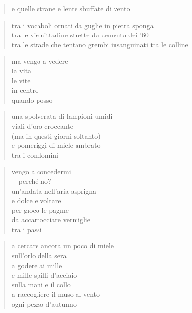 \begin{verse}
    e quelle strane e lente sbuffate di vento
\end{verse}

\begin{verse}
    tra i vocaboli ornati da guglie in pietra sponga\\
    tra le vie cittadine strette da cemento dei '60\\
    tra le strade che tentano grembi insanguinati tra le colline
\end{verse}

\begin{verse}
    ma vengo a vedere\\
    la vita\\
    le vite\\
    in centro\\
    quando posso
\end{verse}

\clearpage


\begin{verse}
    una spolverata di lampioni umidi\\
    viali d'oro croccante\\
    (ma in questi giorni soltanto)\\
    e pomeriggi di miele ambrato\\
    tra i condomini
\end{verse}

\clearpage


\begin{verse}
    vengo a concedermi\\
    —perché no?—\\
    un'andata nell'aria asprigna\\
    e dolce e voltare\\
    per gioco le pagine\\
    da accartocciare vermiglie\\
    tra i passi
\end{verse}

\begin{verse}
    a cercare ancora un poco di miele\\
    sull'orlo della sera\\
    a godere ai mille\\
    e mille spilli d'acciaio\\
    sulla mani e il collo\\
    a raccogliere il muso al vento\\
    ogni pezzo d'autunno
\end{verse}


